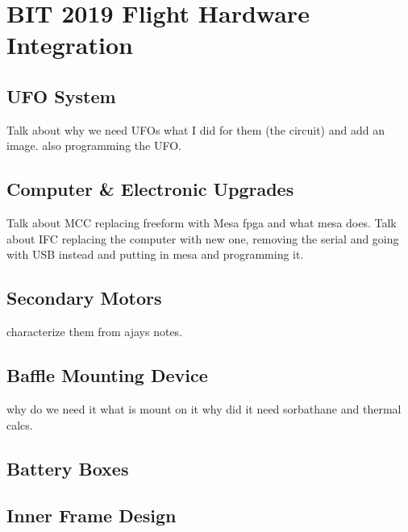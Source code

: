 \chapter{BIT 2019 Flight Hardware Integration}

\section{UFO System}
Talk about why we need UFOs what I did for them (the circuit) and add an image. also programming the UFO.

\section{Computer \& Electronic Upgrades}
Talk about MCC replacing freeform with Mesa fpga and what mesa does. 
Talk about IFC replacing the computer with new one, removing the serial and going with USB instead and putting in mesa and programming it.

\section{Secondary Motors}
characterize them from ajays notes.

\section{Baffle Mounting Device}
why do we need it what is mount on it why did it need sorbathane and thermal calcs.

\section{Battery Boxes}

\section{Inner Frame Design}


